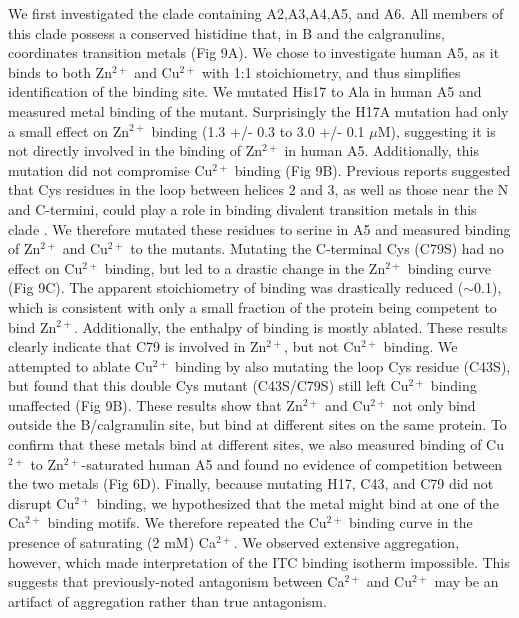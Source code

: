 We first investigated the clade containing A2,A3,A4,A5, and A6. All
members of this clade possess a conserved histidine that, in B and
the calgranulins, coordinates transition metals (Fig 9A). We chose
to investigate human A5, as it binds to both Zn$^{2+}$ and Cu$^{2+}$
with 1:1 stoichiometry, and thus simplifies identification of the
binding site. We mutated His17 to Ala in human A5 and measured metal
binding of the mutant. Surprisingly the H17A mutation had only a small
effect on Zn$^{2+}$ binding (1.3 +/- 0.3 to 3.0 +/- 0.1 $\mu$M),
suggesting it is not directly involved in the binding of Zn$^{2+}$
in human A5. Additionally, this mutation did not compromise Cu$^{2+}$
binding (Fig 9B). Previous reports suggested that Cys residues in
the loop between helices 2 and 3, as well as those near the N and
C-termini, could play a role in binding divalent transition metals
in this clade \cite{moroz_role_2010,koch_implications_2007,kordowska_ca2+_1998}.
We therefore mutated these residues to serine in A5 and measured binding
of Zn$^{2+}$ and Cu$^{2+}$ to the mutants. Mutating the C-terminal
Cys (C79S) had no effect on Cu$^{2+}$ binding, but led to a drastic
change in the Zn$^{2+}$ binding curve (Fig 9C). The apparent stoichiometry
of binding was drastically reduced ($\sim$0.1), which is consistent
with only a small fraction of the protein being competent to bind
Zn$^{2+}$. Additionally, the enthalpy of binding is mostly ablated.
These results clearly indicate that C79 is involved in Zn$^{2+}$,
but not Cu$^{2+}$ binding. We attempted to ablate Cu$^{2+}$ binding
by also mutating the loop Cys residue (C43S), but found that this
double Cys mutant (C43S/C79S) still left Cu$^{2+}$ binding unaffected
(Fig 9B). These results show that Zn$^{2+}$ and Cu$^{2+}$ not only
bind outside the B/calgranulin site, but bind at different sites on
the same protein. To confirm that these metals bind at different sites,
we also measured binding of Cu$^{2+}$ to Zn$^{2+}$-saturated human
A5 and found no evidence of competition between the two metals (Fig
6D). Finally, because mutating H17, C43, and C79 did not disrupt Cu$^{2+}$
binding, we hypothesized that the metal might bind at one of the Ca$^{2+}$
binding motifs. We therefore repeated the Cu$^{2+}$ binding curve
in the presence of saturating (2 mM) Ca$^{2+}$. We observed extensive
aggregation, however, which made interpretation of the ITC binding
isotherm impossible. This suggests that previously-noted antagonism
between Ca$^{2+}$ and Cu$^{2+}$ \cite{schafer_brain_2000} may be
an artifact of aggregation rather than true antagonism.

